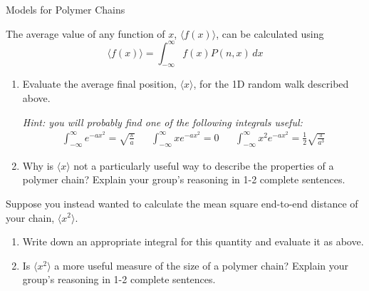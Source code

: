 \begin{activity}{Models for Polymer Chains}
\begin{ctqs}
		The average value of any function of $x$, $\langle f(x)\rangle$, can be calculated using
		\begin{equation*}
			\langle f(x) \rangle = \int_{-\infty}^\infty f(x) P(n,x)\,dx
		\end{equation*}
		
		\begin{enumerate}
			\item Evaluate the average final position, $\langle x \rangle$, for the 1D random walk described above.
			
				\emph{Hint: you will probably find one of the following integrals useful:}
				\begin{align*}
					\int_{-\infty}^\infty e^{-a x^2} = \sqrt{\frac{\pi}{a}} && \int_{-\infty}^\infty x e^{-a x^2} = 0 && \int_{-\infty}^\infty x^2 e^{-a x^2} = \frac{1}{2}\sqrt{\frac{\pi}{a^3}}
				\end{align*}
				
				\begin{solution}[1.5in]
				\end{solution}
				
			\item Why is $\langle x \rangle$ not a particularly useful way to describe the properties of a polymer chain?  Explain your group's reasoning in 1-2 complete sentences.
				
				\begin{solution}[1.5in]
				\end{solution}
			
		\end{enumerate}
		
	\question Suppose you instead wanted to calculate the mean square end-to-end distance of your chain, $\langle x^2\rangle$.
	
		\begin{enumerate}
			\item Write down an appropriate integral for this quantity and evaluate it as above.
				
				\begin{solution}[1.5in]
				\end{solution}
			
			\item Is $\langle x^2 \rangle$ a more useful measure of the size of a polymer chain?  Explain your group's reasoning in 1-2 complete sentences.
				
				\begin{solution}[1.5in]
				\end{solution}
		\end{enumerate}
		


\end{ctqs}
\end{activity}
